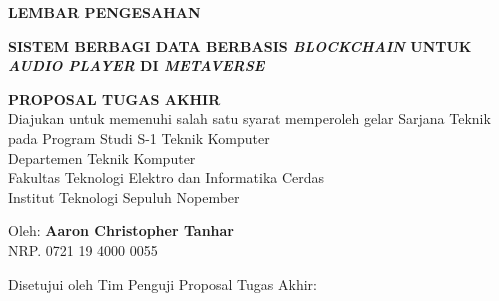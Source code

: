 \begin{center}
  \large
  \textbf{LEMBAR PENGESAHAN}
\end{center}

\thispagestyle{empty}

\begin{center}
  \textbf{SISTEM BERBAGI DATA BERBASIS \emph{BLOCKCHAIN} UNTUK \emph{AUDIO PLAYER}
    DI \emph{METAVERSE}}
\end{center}

\begingroup
\small

\begin{center}
  \textbf{PROPOSAL TUGAS AKHIR} \\
  Diajukan untuk memenuhi salah satu syarat memperoleh gelar
  Sarjana Teknik pada
  Program Studi S-1 Teknik Komputer \\
  Departemen Teknik Komputer \\
  Fakultas Teknologi Elektro dan Informatika Cerdas \\
  Institut Teknologi Sepuluh Nopember
\end{center}

\begin{center}
  Oleh: \textbf{Aaron Christopher Tanhar} \\
  NRP. 0721 19 4000 0055
\end{center}

\begin{center}
  Disetujui oleh Tim Penguji Proposal Tugas Akhir:
\end{center}

\begingroup
\setlength{\tabcolsep}{0pt}

